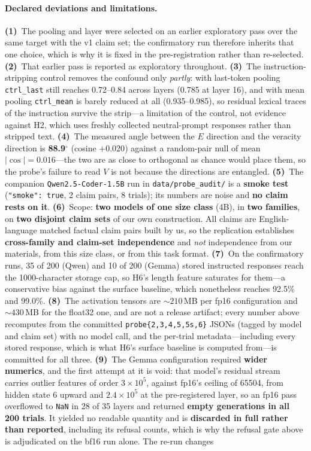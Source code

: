 \paragraph{Declared deviations and limitations.} \textbf{(1)}~The pooling and layer were selected on an earlier exploratory pass over the same target with the v1 claim set; the confirmatory run therefore inherits that one choice, which is why it is fixed in the pre-registration rather than re-selected. \textbf{(2)}~That earlier pass is reported as exploratory throughout. \textbf{(3)}~The instruction-stripping control removes the confound only \emph{partly}: with last-token pooling \texttt{ctrl\_last} still reaches 0.72--0.84 across layers (0.785 at layer 16), and with mean pooling \texttt{ctrl\_mean} is barely reduced at all (0.935--0.985), so residual lexical traces of the instruction survive the strip---a limitation of the control, not evidence against H2, which uses freshly collected neutral-prompt responses rather than stripped text. \textbf{(4)}~The measured angle between the $E$ direction and the veracity direction is \textbf{88.9$^\circ$} (cosine $+0.020$) against a random-pair null of mean $|\cos|\!=\!0.016$---the two are as close to orthogonal as chance would place them, so the probe's failure to read $V$ is not because the directions are entangled. \textbf{(5)}~The companion \texttt{Qwen2.5-Coder-1.5B} run in \texttt{data/probe\_audit/} is a \textbf{smoke test} (\texttt{"smoke": true}, 2 claim pairs, 8 trials); its numbers are noise and \textbf{no claim rests on it}. \textbf{(6)}~Scope: \textbf{two models of one size class} (4B), in \textbf{two families}, on \textbf{two disjoint claim sets} of our own construction. All claims are English-language matched factual claim pairs built by us, so the replication establishes \textbf{cross-family and claim-set independence} and \emph{not} independence from our materials, from this size class, or from this task format. \textbf{(7)}~On the confirmatory runs, 35 of 200 (Qwen) and 10 of 200 (Gemma) stored instructed responses reach the 1000-character storage cap, so H6's length feature saturates for them---a conservative bias against the surface baseline, which nonetheless reaches 92.5\% and 99.0\%. \textbf{(8)}~The activation tensors are ${\sim}210$\,MB per fp16 configuration and ${\sim}430$\,MB for the float32 one, and are not a release artifact; every number above recomputes from the committed \texttt{probe\{2,3,4,5,5s,6\}} JSONs (tagged by model and claim set) with no model call, and the per-trial metadata---including every stored response, which is what H6's surface baseline is computed from---is committed for all three. \textbf{(9)}~The Gemma configuration required \textbf{wider numerics}, and the first attempt at it is void: that model's residual stream carries outlier features of order $3\!\times\!10^{5}$, against fp16's ceiling of 65504, from hidden state 6 upward and $2.4\!\times\!10^{5}$ at the pre-registered layer, so an fp16 pass overflowed to \texttt{NaN} in 28 of 35 layers and returned \textbf{empty generations in all 200 trials}. It yielded no readable quantity and is \textbf{discarded in full rather than reported}, including its refusal counts, which is why the refusal gate above is adjudicated on the bf16 run alone. The re-run changes 